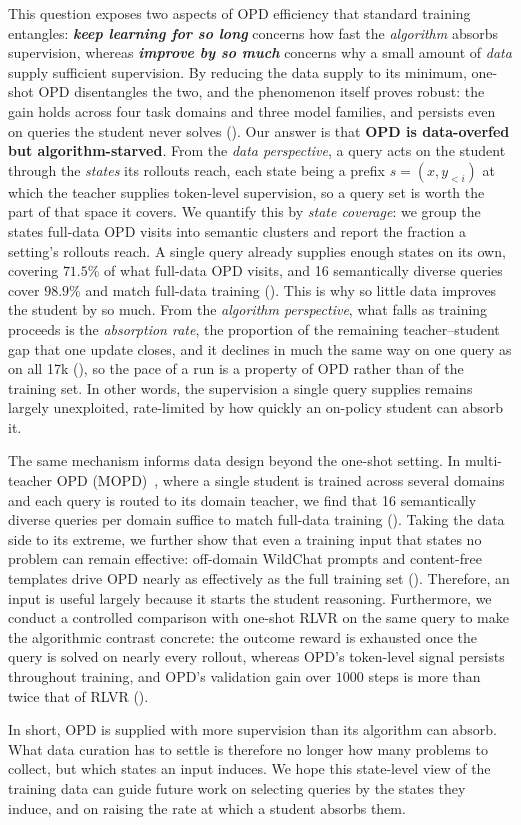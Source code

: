 This question exposes two aspects of OPD efficiency that standard training entangles:
\textit{\textbf{keep learning for so long}} concerns how fast the \textit{algorithm} absorbs supervision, whereas \textit{\textbf{improve by so much}} concerns why a small amount of \textit{data} supply sufficient supervision.
By reducing the data supply to its minimum, one-shot OPD disentangles the two, and the phenomenon itself proves robust: the gain holds across four task domains and three model families, and persists even on queries the student never solves ().
Our answer is that \textbf{OPD is data-overfed but algorithm-starved}.
From the \textit{data perspective}, a query acts on the student through the \emph{states} its rollouts reach, each state being a prefix \(s=(x,y_{<i})\) at which the teacher supplies token-level supervision, so a query set is worth the part of that space it covers. We quantify this by \emph{state coverage}: we group the states full-data OPD visits into semantic clusters and report the fraction a setting's rollouts reach. A single query already supplies enough states on its own, covering \(71.5\%\) of what full-data OPD visits, and 16 semantically diverse queries cover \(98.9\%\) and match full-data training (). This is why so little data improves the student by so much. From the \textit{algorithm perspective}, what falls as training proceeds is the \emph{absorption rate}, the proportion of the remaining teacher--student gap that one update closes, and it declines in much the same way on one query as on all 17k (), so the pace of a run is a property of OPD rather than of the training set.
In other words, the supervision a single query supplies remains largely unexploited, rate-limited by how quickly an on-policy student can absorb it.

The same mechanism informs data design beyond the one-shot setting.
In multi-teacher OPD (MOPD)~\citep{xiao2026mimo,xu2026deepseek}, where a single student is trained across several domains and each query is routed to its domain teacher, we find that 16 semantically diverse queries per domain suffice to match full-data training ().
Taking the data side to its extreme, we further show that even a training input that states no problem can remain effective: off-domain WildChat prompts and content-free templates drive OPD nearly as effectively as the full training set ().
Therefore, an input is useful largely because it starts the student reasoning.
Furthermore, we conduct a controlled comparison with one-shot RLVR on the same query to make the algorithmic contrast concrete: the outcome reward is exhausted once the query is solved on nearly every rollout, whereas OPD's token-level signal persists throughout training, and OPD's validation gain over $1000$ steps is more than twice that of RLVR ().

In short, OPD is supplied with more supervision than its algorithm can absorb.
What data curation has to settle is therefore no longer how many problems to collect, but which states an input induces.
We hope this state-level view of the training data can guide future work on selecting queries by the states they induce, and on raising the rate at which a student absorbs them.
